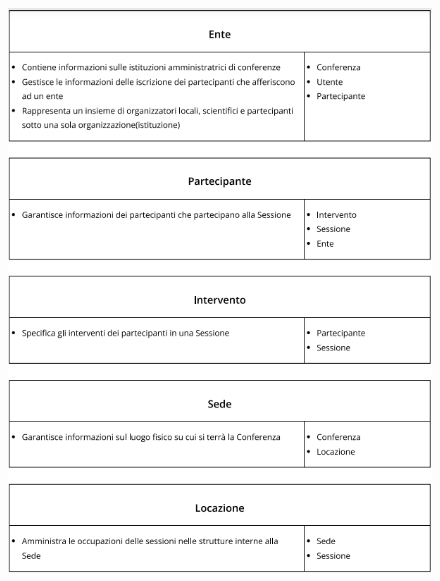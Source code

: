 \documentclass[a4paper,italian,10pt,openany]{book}
\begin{document}
	\begin{figure}[h!]
	\centering
	\includegraphics[width=17cm]{crc_cards3}
	\end{figure}
	\newpage
\end{document}
